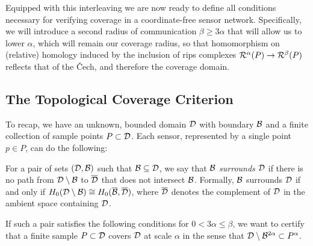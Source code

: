 Equipped with this interleaving we are now ready to define all conditions necessary for verifying coverage in a coordinate-free sensor network.
Specifically, we will introduce a second radius of communication $\beta\geq 3\alpha$ that will allow us to lower $\alpha$, which will remain our coverage radius, so that homomorphism on (relative) homology induced by the inclusion of rips complexes $\mathcal{R}^\alpha(P)\to\mathcal{R}^\beta(P)$ reflects that of the \v Cech, and therefore the coverage domain.

\subsection{The Topological Coverage Criterion}

To recap, we have an unknown, bounded domain ${\mathcal{D}}$ with boundary ${\mathcal{B}}$ and a finite collection of sample points $P\subset{\mathcal{D}}$.
Each sensor, represented by a single point $p\in P$, can do the following:

\vspace{3ex}
\begin{center}
\setlength{\fboxsep}{2ex}
\end{center}\vspace{3ex}

\begin{definition}
    For a pair of sets $({\mathcal{D}}, {\mathcal{B}})$ such that ${\mathcal{B}}\subseteq {\mathcal{D}}$, we say that ${\mathcal{B}}$ \emph{surrounds} ${\mathcal{D}}$ if there is no path from ${\mathcal{D}}\setminus{\mathcal{B}}$ to $\overline{{\mathcal{D}}}$ that does not intersect ${\mathcal{B}}$.
    Formally, ${\mathcal{B}}$ surrounds ${\mathcal{D}}$ if and only if $H_0({\mathcal{D}}\setminus {\mathcal{B}}) \cong H_0(\overline{{\mathcal{B}}}, \overline{{\mathcal{D}}})$, where $\overline{{\mathcal{D}}}$ denotes the complement of ${\mathcal{D}}$ in the ambient space containing ${\mathcal{D}}$.
\end{definition}

If such a pair satisfies the following conditions for $0 < 3\alpha\leq \beta$, we want to certify that a finite sample $P\subset{\mathcal{D}}$ covers ${\mathcal{D}}$ at scale $\alpha$ in the sense that ${\mathcal{D}}\setminus{\mathcal{B}}^{2\alpha}\subset P^\alpha$.

